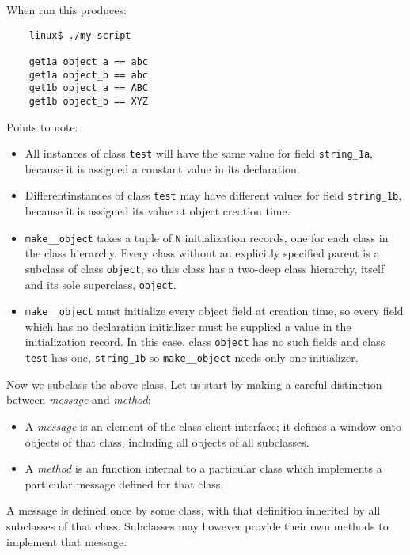When run this produces:

\begin{verbatim}
    linux$ ./my-script

    get1a object_a == abc
    get1a object_b == abc
    get1b object_a == ABC
    get1b object_b == XYZ
\end{verbatim}

Points to note:

\begin{itemize}
\item All instances of class {\tt test} will have the same value for field 
      {\tt string\_1a}, because it is assigned a constant value in its declaration. 
\item Differentinstances of class {\tt test} may have different values for field 
      {\tt string\_1b}, because it is assigned its value at object creation time. 
\item {\tt make\_\_object} takes a tuple of {\tt N} initialization records, 
      one for each class in the class hierarchy.  Every class without an explicitly 
      specified parent is a subclass of class {\tt object}, so this class has a 
      two-deep class hierarchy, itself and its sole superclass, {\tt object}. 
\item {\tt make\_\_object} must initialize every object field at creation time, so every field 
      which has no declaration initializer must be supplied a value in the initialization 
      record.  In this case, class {\tt object} has no such fields and class {\tt test} 
      has one, {\tt string\_1b} so {\tt make\_\_object} needs only one initializer. 
\end{itemize}

Now we subclass the above class.  Let us start by making a careful distinction 
between {\it message} and {\it method}:

\begin{itemize}
\item A {\it message} is an element of the class client interface;  it defines 
      a window onto objects of that class, including all objects of all subclasses.
\item A {\it method} is an function internal to a particular class which 
      implements a particular message defined for that class.
\end{itemize}

A message is defined once by some class, with that definition inherited by 
all subclasses of that class.  Subclasses may however provide their own 
methods to implement that message.

